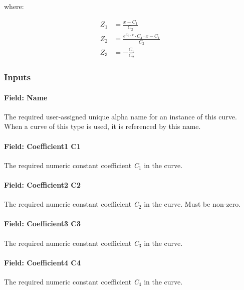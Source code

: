 where:

\begin{align*}
  Z_1 &= \frac{x - C_1}{C_2} \\
  Z_2 &= \frac{e^{C_3 \cdot x} \cdot C_4 \cdot x - C_1}{C_2} \\
  Z_3 &= -\frac{C_1}{C_2}
\end{align*}

\subsubsection{Inputs}\label{inputs-13-008}

\paragraph{Field: Name}\label{field-name-13-006}

The required user-assigned unique alpha name for an instance of this curve. When a curve of this type is used, it is referenced by this name.

\paragraph{Field: Coefficient1 C1}\label{field-coefficient1-c1}

The required numeric constant coefficient \emph{C\(_{1}\)} in the curve.

\paragraph{Field: Coefficient2 C2}\label{field-coefficient2-c2}

The required numeric constant coefficient \emph{C\(_{2}\)} in the curve. Must be non-zero.

\paragraph{Field: Coefficient3 C3}\label{field-coefficient3-c3}

The required numeric constant coefficient \emph{C\(_{3}\)} in the curve.

\paragraph{Field: Coefficient4 C4}\label{field-coefficient4-c4}

The required numeric constant coefficient \emph{C\(_{4}\)} in the curve.

